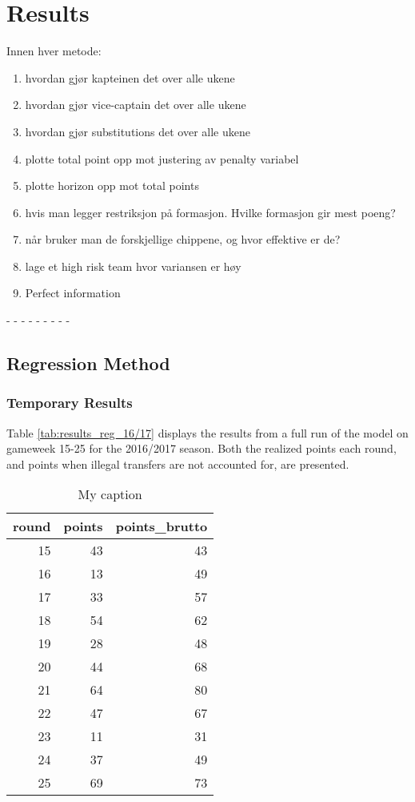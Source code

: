 
\chapter{Results}
Innen hver metode:
\begin{enumerate}
    \item hvordan gjør kapteinen det over alle ukene
    \item hvordan gjør vice-captain det over alle ukene
    \item hvordan gjør substitutions det over alle ukene
    \item plotte total point opp mot justering av penalty variabel
    \item plotte horizon opp mot total points
    \item hvis man legger restriksjon på formasjon. Hvilke formasjon gir mest poeng?
    \item når bruker man de forskjellige chippene, og hvor effektive er de?  
    \item lage et high risk team hvor variansen er høy
    \item Perfect information
\end{enumerate}
-  
- 
-  
-  
-  
- 
- 
-  
-  
\section{Regression Method}
\subsection{Temporary Results}

Table \ref{tab:results_reg_16/17} displays the results from a full run of the model on gameweek 15-25 for the 2016/2017 season. Both the realized points each round, and points when illegal transfers are not accounted for, are presented.


\begin{table}[]
\centering
\caption{My caption}
\label{my-label}
\begin{tabular}{@{}rrr@{}}
\toprule
round & points & points\_brutto \\ 
\midrule
15    & 43     & 43             \\
16    & 13     & 49             \\
17    & 33     & 57             \\
18    & 54     & 62             \\
19    & 28     & 48             \\
20    & 44     & 68             \\
21    & 64     & 80             \\
22    & 47     & 67             \\
23    & 11     & 31             \\
24    & 37     & 49             \\
25    & 69     & 73             \\ 
\end{tabular}
\end{table}


